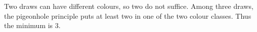 Two draws can have different colours, so two do not suffice. Among three draws, the pigeonhole principle puts at least two in one of the two colour classes. Thus the minimum is $\boxed3$.
